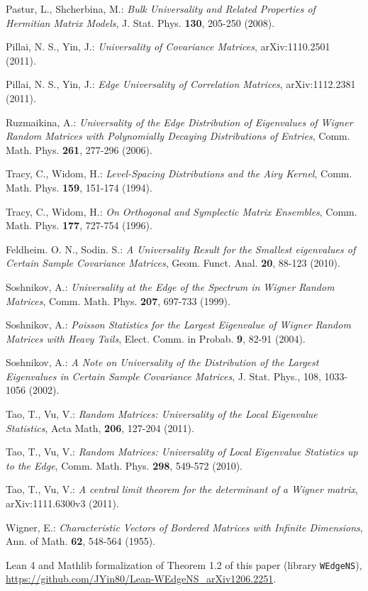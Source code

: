 \documentclass[reqno, 10pt]{amsart}
\theoremstyle{definition}
\theoremstyle{remark}
\numberwithin{equation}{section}
\numberwithin{thm}{section}
\begin{document}
\begin{thebibliography}{}
 Pastur, L., Shcherbina, M.: \emph{Bulk Universality and Related Properties of Hermitian Matrix Models}, J. Stat. Phys. \textbf{130}, 205-250 (2008).

 Pillai, N. S., Yin, J.: \emph{Universality of Covariance Matrices}, arXiv:1110.2501 (2011).

 Pillai, N. S., Yin, J.: \emph{Edge Universality of Correlation Matrices}, arXiv:1112.2381 (2011).

 Ruzmaikina, A.: \emph{Universality of the Edge Distribution of Eigenvalues of Wigner Random Matrices with Polynomially Decaying Distributions of Entries}, Comm. Math. Phys. \textbf{261}, 277-296 (2006).

 Tracy, C., Widom, H.: \emph{Level-Spacing Distributions and the Airy Kernel}, Comm. Math. Phys. \textbf{159}, 151-174 (1994).

 Tracy, C., Widom, H.: \emph{On Orthogonal and Symplectic Matrix Ensembles}, Comm. Math. Phys. \textbf{177}, 727-754 (1996).

 Feldheim. O. N., Sodin. S.: \emph{A Universality Result for the Smallest eigenvalues of Certain Sample Covariance Matrices}, Geom. Funct. Anal. \textbf{20}, 88-123 (2010).

 Soshnikov, A.: \emph{Universality at the Edge of the Spectrum in Wigner Random Matrices}, Comm. Math. Phys. \textbf{207}, 697-733 (1999).

 Soshnikov, A.: \emph{Poisson Statistics for the Largest Eigenvalue of Wigner Random Matrices with Heavy Tails}, Elect. Comm. in Probab. \textbf{9}, 82-91 (2004).

 Soshnikov, A.: \emph{A Note on Universality of the Distribution of the Largest Eigenvalues in Certain
Sample Covariance Matrices}, J. Stat. Phys., 108, 1033-1056 (2002).

 Tao, T., Vu, V.: \emph{Random Matrices: Universality of the Local Eigenvalue Statistics}, Acta Math, \textbf{206}, 127-204 (2011).

 Tao, T., Vu, V.: \emph{Random Matrices: Universality of Local Eigenvalue Statistics up to the Edge}, Comm. Math. Phys. \textbf{298}, 549-572 (2010).

 Tao, T., Vu, V.: \emph{A central limit theorem for the determinant of a Wigner matrix}, arXiv:1111.6300v3 (2011).

 Wigner, E.: \emph{Characteristic Vectors of Bordered Matrices with Infinite Dimensions}, Ann. of Math. \textbf{62}, 548-564 (1955).

 Lean 4 and Mathlib formalization of Theorem 1.2 of this paper (library \texttt{WEdgeNS}), \url{https://github.com/JYin80/Lean-WEdgeNS_arXiv1206.2251}.

\end{thebibliography}
\end{document}
